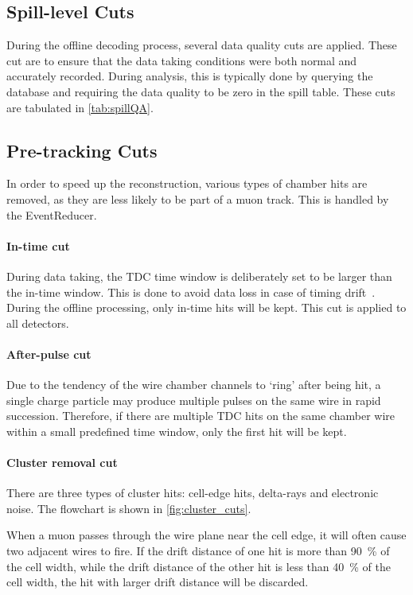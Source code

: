 \documentclass[../main.tex]{subfiles}
\begin{document}
\subsection{Spill-level Cuts}
During the offline decoding process, several data quality cuts are applied.
These cut are to ensure that the data taking conditions were both normal and accurately recorded.
During analysis, this is typically done by querying the database
and requiring the data quality to be zero in the spill table.
These cuts are tabulated in \cref{tab:spillQA}.



\subsection{Pre-tracking Cuts}
In order to speed up the reconstruction, various types of chamber hits are removed, as
they are less likely to be part of a muon track. This is handled by the EventReducer.

\paragraph{In-time cut}
During data taking, the TDC time window is deliberately set to be larger than the in-time
window. This is done to avoid data loss in case of timing drift~\cite{daniel-4924}.
During the offline processing, only in-time hits will be kept. This cut is applied to
all detectors.

\paragraph{After-pulse cut}
Due to the tendency of the wire chamber channels to `ring' after being hit,
a single charge particle may produce multiple pulses on the same
wire in rapid succession. Therefore, if there are multiple TDC hits on the same chamber wire
within a small predefined time window, only the first hit will be kept.

\paragraph{Cluster removal cut}
There are three types of cluster hits: cell-edge hits, delta-rays and electronic noise. The flowchart
is shown in \cref{fig:cluster_cuts}.

When a muon passes through the wire plane near the cell edge, it will often cause two adjacent
wires to fire. If the drift distance of one hit is more than \SI{90}{\percent} of the cell width,
while the drift distance of the other hit is less than \SI{40}{\percent} of the cell width, the hit
with larger drift distance will be discarded.
\end{document}
